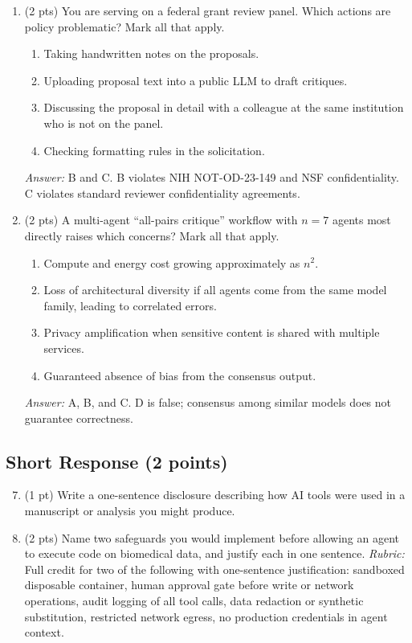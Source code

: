 \documentclass[11pt,letterpaper]{article}
\begin{document}
\begin{enumerate}
    \item (2 pts) You are serving on a federal grant review panel. Which actions are policy problematic? Mark all that apply.
    \begin{enumerate}[label=\Alph*.]
        \item Taking handwritten notes on the proposals.
        \item Uploading proposal text into a public LLM to draft critiques.
        \item Discussing the proposal in detail with a colleague at the same institution who is not on the panel.
        \item Checking formatting rules in the solicitation.
    \end{enumerate}
    \emph{Answer:} B and C. B violates NIH NOT-OD-23-149 and NSF confidentiality. C violates standard reviewer confidentiality agreements.
    
    \item (2 pts) A multi-agent ``all-pairs critique'' workflow with $n=7$ agents most directly raises which concerns? Mark all that apply.
    \begin{enumerate}[label=\Alph*.]
        \item Compute and energy cost growing approximately as $n^2$.
        \item Loss of architectural diversity if all agents come from the same model family, leading to correlated errors.
        \item Privacy amplification when sensitive content is shared with multiple services.
        \item Guaranteed absence of bias from the consensus output.
    \end{enumerate}
    \emph{Answer:} A, B, and C. D is false; consensus among similar models does not guarantee correctness.
\end{enumerate}

\subsection{Short Response (2 points)}

\begin{enumerate}
    \setcounter{enumi}{6}
    \item (1 pt) Write a one-sentence disclosure describing how AI tools were used in a manuscript or analysis you might produce.
    
    \item (2 pts) Name two safeguards you would implement before allowing an agent to execute code on biomedical data, and justify each in one sentence. \emph{Rubric:} Full credit for two of the following with one-sentence justification: sandboxed disposable container, human approval gate before write or network operations, audit logging of all tool calls, data redaction or synthetic substitution, restricted network egress, no production credentials in agent context.
\end{enumerate}
\end{document}
